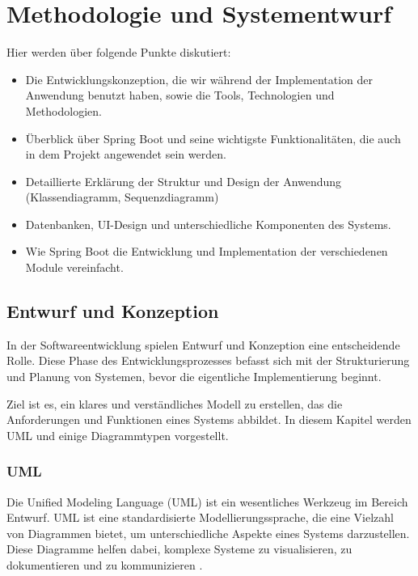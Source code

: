 \chapter{Methodologie und Systementwurf }

Hier werden über folgende Punkte diskutiert:

\begin{itemize}
	\item Die Entwicklungskonzeption, die wir während der Implementation der Anwendung benutzt haben, sowie die Tools, Technologien und Methodologien. 
	\item Überblick über Spring Boot und seine wichtigste  Funktionalitäten, die auch in dem Projekt angewendet sein werden. 
	\item Detaillierte Erklärung der Struktur und Design der Anwendung (Klassendiagramm, Sequenzdiagramm) 
	\item Datenbanken, UI-Design und unterschiedliche Komponenten des Systems. 
	\item Wie Spring Boot die Entwicklung und Implementation der verschiedenen Module vereinfacht. 
\end{itemize}


\section{Entwurf und Konzeption}

In der Softwareentwicklung spielen Entwurf und Konzeption eine entscheidende Rolle. Diese Phase des Entwicklungsprozesses befasst sich mit der Strukturierung und Planung von Systemen, bevor die eigentliche Implementierung beginnt. 

Ziel ist es, ein klares und verständliches Modell zu erstellen, das die Anforderungen und Funktionen eines Systems abbildet. In diesem Kapitel werden UML und einige Diagrammtypen vorgestellt.

\subsection{UML}

Die Unified Modeling Language (UML) ist ein wesentliches Werkzeug im Bereich Entwurf. UML ist eine standardisierte Modellierungssprache, die eine Vielzahl von Diagrammen bietet, um unterschiedliche Aspekte eines Systems darzustellen. Diese Diagramme helfen dabei, komplexe Systeme zu visualisieren, zu dokumentieren und zu kommunizieren \cite{UML:2023}. 

